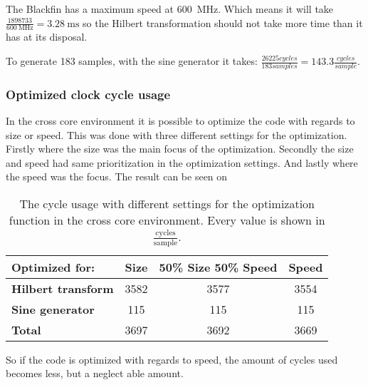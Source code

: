 The Blackfin has a maximum speed at \SI{600}{\mega\hertz}.
Which means it will take $\frac{\num{1898733}}{\SI{600}{\mega\hertz}} = {\SI{3.28}{\milli\second}}$ so the Hilbert transformation should not take more time than it has at its disposal.

To generate 183 samples, with the sine generator it takes: $\frac{26225 cycles}{183 samples} = 143.3\frac{cycles}{sample}$. 

\subsubsection{Optimized clock cycle usage}
In the cross core environment it is possible to optimize the code with regards to size or speed.
This was done with three different settings for the optimization. 
Firstly where the size was the main focus of the optimization. 
Secondly the size and speed had same prioritization in the optimization settings.
And lastly where the speed was the focus. The result can be seen on
\begin{table}
	\centering
	\begin{tabularx}{0.8\textwidth}{l c c c}
		\toprule
		{\textbf{Optimized for:}} & \textbf{Size} & \textbf{50\% Size 50\% Speed} & \textbf{Speed} \\
		\midrule
		\textbf{Hilbert transform} & \num{3582} & \num{3577} & \num{3554} \\
		\textbf{Sine generator} & \num{115} & \num{115} & \num{115} \\
		\textbf{Total} & \num{3697} & \num{3692} & \num{3669} \\
		\bottomrule
	\end{tabularx}
	\caption{The cycle usage with different settings for the optimization function in the cross core environment. Every value is shown in $\frac{\text{cycles}}{\text{sample}}$.}
	\label{OptimizedCycleUsage}
\end{table}

So if the code is optimized with regards to speed, the amount of cycles used becomes less, but a neglect able amount.  

\FloatBarrier